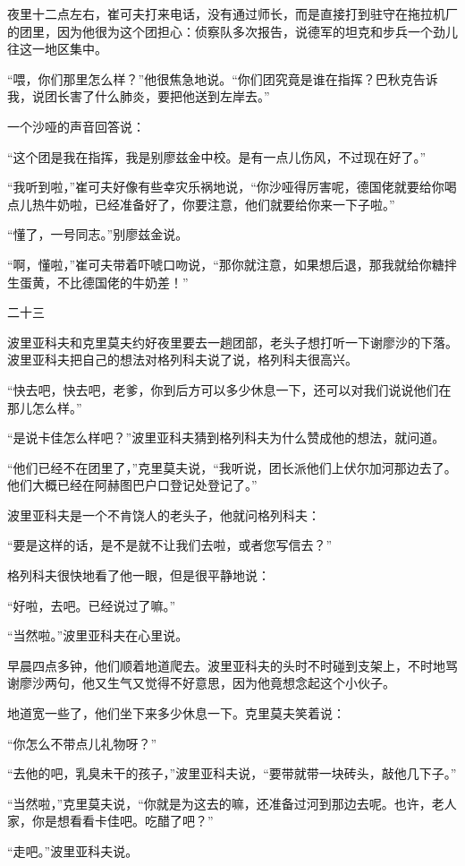 夜里十二点左右，崔可夫打来电话，没有通过师长，而是直接打到驻守在拖拉机厂的团里，因为他很为这个团担心：侦察队多次报告，说德军的坦克和步兵一个劲儿往这一地区集中。

“喂，你们那里怎么样？”他很焦急地说。“你们团究竟是谁在指挥？巴秋克告诉我，说团长害了什么肺炎，要把他送到左岸去。”

一个沙哑的声音回答说：

“这个团是我在指挥，我是别廖兹金中校。是有一点儿伤风，不过现在好了。”

“我听到啦，”崔可夫好像有些幸灾乐祸地说，“你沙哑得厉害呢，德国佬就要给你喝点儿热牛奶啦，已经准备好了，你要注意，他们就要给你来一下子啦。”

“懂了，一号同志。”别廖兹金说。

“啊，懂啦，”崔可夫带着吓唬口吻说，“那你就注意，如果想后退，那我就给你糖拌生蛋黄，不比德国佬的牛奶差！”

二十三

波里亚科夫和克里莫夫约好夜里要去一趟团部，老头子想打听一下谢廖沙的下落。波里亚科夫把自己的想法对格列科夫说了说，格列科夫很高兴。

“快去吧，快去吧，老爹，你到后方可以多少休息一下，还可以对我们说说他们在那儿怎么样。”

“是说卡佳怎么样吧？”波里亚科夫猜到格列科夫为什么赞成他的想法，就问道。

“他们已经不在团里了，”克里莫夫说，“我听说，团长派他们上伏尔加河那边去了。他们大概已经在阿赫图巴户口登记处登记了。”

波里亚科夫是一个不肯饶人的老头子，他就问格列科夫：

“要是这样的话，是不是就不让我们去啦，或者您写信去？”

格列科夫很快地看了他一眼，但是很平静地说：

“好啦，去吧。已经说过了嘛。”

“当然啦。”波里亚科夫在心里说。

早晨四点多钟，他们顺着地道爬去。波里亚科夫的头时不时碰到支架上，不时地骂谢廖沙两句，他又生气又觉得不好意思，因为他竟想念起这个小伙子。

地道宽一些了，他们坐下来多少休息一下。克里莫夫笑着说：

“你怎么不带点儿礼物呀？”

“去他的吧，乳臭未干的孩子，”波里亚科夫说，“要带就带一块砖头，敲他几下子。”

“当然啦，”克里莫夫说，“你就是为这去的嘛，还准备过河到那边去呢。也许，老人家，你是想看看卡佳吧。吃醋了吧？”

“走吧。”波里亚科夫说。

